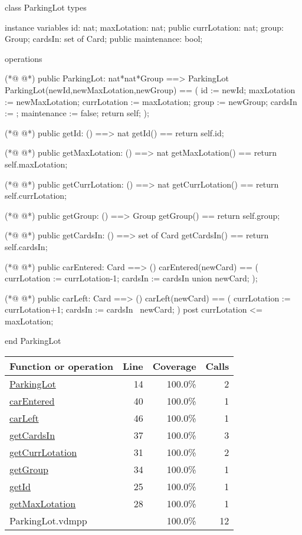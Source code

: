 \begin{vdmpp}[breaklines=true]
class ParkingLot
types

instance variables
id: nat;
maxLotation: nat;
public currLotation: nat;
group: Group;
cardsIn: set of Card;
public maintenance: bool;

operations

(*@
\label{ParkingLot:14}
@*)
public ParkingLot: nat*nat*Group ==> ParkingLot
 ParkingLot(newId,newMaxLotation,newGroup) == (
  id := newId;
  maxLotation := newMaxLotation;
  currLotation := maxLotation;
  group := newGroup;
  cardsIn := {};
  maintenance := false;
  return self;
 );
 
(*@
\label{getId:25}
@*)
public getId: () ==> nat
 getId() == return self.id;
 
(*@
\label{getMaxLotation:28}
@*)
public getMaxLotation: () ==> nat
 getMaxLotation() == return self.maxLotation;
 
(*@
\label{getCurrLotation:31}
@*)
public getCurrLotation: () ==> nat
 getCurrLotation() == return self.currLotation;
 
(*@
\label{getGroup:34}
@*)
public getGroup: () ==> Group
 getGroup() == return self.group;
 
(*@
\label{getCardsIn:37}
@*)
public getCardsIn: () ==> set of Card
 getCardsIn() == return self.cardsIn;
 
(*@
\label{carEntered:40}
@*)
public carEntered: Card ==> ()
 carEntered(newCard) == (
  currLotation := currLotation-1;
  cardsIn := cardsIn union {newCard};
 );
 
(*@
\label{carLeft:46}
@*)
public carLeft: Card ==> ()
 carLeft(newCard) == (
  currLotation := currLotation+1;
  cardsIn := cardsIn \ {newCard};
 )
 post currLotation <= maxLotation;

end ParkingLot
\end{vdmpp}
\bigskip
\begin{longtable}{|l|r|r|r|}
\hline
Function or operation & Line & Coverage & Calls \\
\hline
\hline
\hyperref[ParkingLot:14]{ParkingLot} & 14&100.0\% & 2 \\
\hline
\hyperref[carEntered:40]{carEntered} & 40&100.0\% & 1 \\
\hline
\hyperref[carLeft:46]{carLeft} & 46&100.0\% & 1 \\
\hline
\hyperref[getCardsIn:37]{getCardsIn} & 37&100.0\% & 3 \\
\hline
\hyperref[getCurrLotation:31]{getCurrLotation} & 31&100.0\% & 2 \\
\hline
\hyperref[getGroup:34]{getGroup} & 34&100.0\% & 1 \\
\hline
\hyperref[getId:25]{getId} & 25&100.0\% & 1 \\
\hline
\hyperref[getMaxLotation:28]{getMaxLotation} & 28&100.0\% & 1 \\
\hline
\hline
ParkingLot.vdmpp & & 100.0\% & 12 \\
\hline
\end{longtable}

